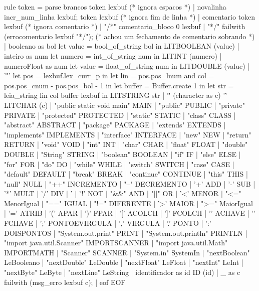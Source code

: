 \documentclass[12pt,a4paper,twoside]{report}
\begin{document}
\begin{terminal}
rule token = parse
    brancos { token lexbuf } (* ignora espacos *)
  | novalinha { incr_num_linha lexbuf; token lexbuf } (* ignora fim de linha *)
  | comentario { token lexbuf } (* ignora comentario *)
  | "/*" { comentario_bloco 0 lexbuf }
  | "*/" { failwith (errocomentario lexbuf "*/"); } (* achou um fechamento de comentario sobrando *)
  | booleano as bol { let value = bool_of_string bol in
                    LITBOOLEAN (value)}
  | inteiro as num { let numero = int_of_string num in
                   LITINT (numero) }
  | numeroFloat as num { let value = float_of_string num in LITDOUBLE (value) }
  | '"'  { let pos = lexbuf.lex_curr_p in
           let lin = pos.pos_lnum
           and col = pos.pos_cnum - pos.pos_bol - 1 in
           let buffer = Buffer.create 1 in
           let str = leia_string lin col buffer lexbuf in
           LITSTRING str }
  | '\'' (character as c) '\'' { LITCHAR (c) }
  | "public static void main" { MAIN }
  | "public" { PUBLIC }
  | "private" { PRIVATE }
  | "protected" { PROTECTED }
  | "static" { STATIC }
  | "class" { CLASS }
  | "abstract" { ABSTRACT }
  | "package" { PACKAGE }
  | "extends" { EXTENDS }
  | "implements" { IMPLEMENTS }
  | "interface" { INTERFACE } 
  | "new" { NEW }
  | "return" { RETURN }
  | "void" { VOID }
  | "int" { INT }
  | "char" { CHAR }
  | "float" { FLOAT }
  | "double" { DOUBLE }
  | "String" { STRING }
  | "boolean" { BOOLEAN }
  | "if" { IF }
  | "else" { ELSE }
  | "for" { FOR }
  | "do" { DO }
  | "while" { WHILE }
  | "switch" { SWITCH }
  | "case" { CASE }
  | "default" { DEFAULT }
  | "break" { BREAK }
  | "continue" { CONTINUE }
  | "this" { THIS }
  | "null" { NULL }
  | "++" { INCREMENTO }
  | "--" { DECREMENTO }
  | '+' { ADD }
  | '-' { SUB }
  | '*' { MULT }
  | '/' { DIV }
  | '%
  | '!' { NOT }
  | "&&" { AND }
  | "||" { OR }
  | '<' { MENOR }
  | "<=" { MenorIgual }
  | "==" { IGUAL }
  | "!=" { DIFERENTE }
  | '>' { MAIOR }
  | ">=" { MaiorIgual }
  | '=' { ATRIB }
  | '(' { APAR }
  | ')' { FPAR }
  | '[' { ACOLCH }
  | ']' { FCOLCH }
  | '{' { ACHAVE }
  | '}' { FCHAVE }
  | ';' { PONTOEVIRGULA }
  | ',' { VIRGULA }
  | '.' { PONTO }
  | ':' { DOISPONTOS }
  | "System.out.print" { PRINT }
  | "System.out.println" { PRINTLN }
  | "import java.util.Scanner" { IMPORTSCANNER }
  | "import java.util.Math" { IMPORTMATH }
  | "Scanner" { SCANNER }
  | "System.in" { SystemIn }
  | "nextBoolean" { LeBooleano }
  | "nextDouble" { LeDouble }
  | "nextFloat" { LeFloat }
  | "nextInt" { LeInt }
  | "nextByte" { LeByte }
  | "nextLine" { LeString }
  | identificador as id { ID (id) }
  | _ as c { failwith (msg_erro lexbuf c); }
  | eof { EOF }


\end{terminal}
\end{document}
